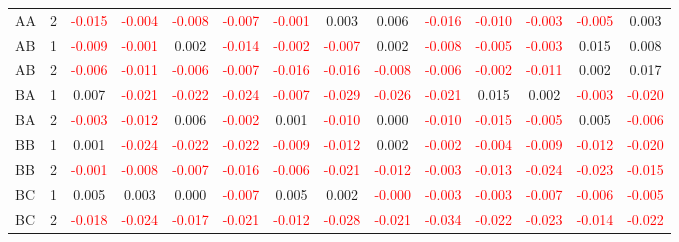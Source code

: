 \begin{table}[!htb]
{\begin{tabular}{llcccccccccccc}
AA & 2 & \textcolor{red}{-0.015} & \textcolor{red}{-0.004} & \textcolor{red}{-0.008} & \textcolor{red}{-0.007} & \textcolor{red}{-0.001} & 0.003 & 0.006 & \textcolor{red}{-0.016} & \textcolor{red}{-0.010} & \textcolor{red}{-0.003} & \textcolor{red}{-0.005} & 0.003\\
AB & 1 & \textcolor{red}{-0.009} & \textcolor{red}{-0.001} & 0.002 & \textcolor{red}{-0.014} & \textcolor{red}{-0.002} & \textcolor{red}{-0.007} & 0.002 & \textcolor{red}{-0.008} & \textcolor{red}{-0.005} & \textcolor{red}{-0.003} & 0.015 & 0.008\\
AB & 2 & \textcolor{red}{-0.006} & \textcolor{red}{-0.011} & \textcolor{red}{-0.006} & \textcolor{red}{-0.007} & \textcolor{red}{-0.016} & \textcolor{red}{-0.016} & \textcolor{red}{-0.008} & \textcolor{red}{-0.006} & \textcolor{red}{-0.002} & \textcolor{red}{-0.011} & 0.002 & 0.017\\
BA & 1 & 0.007 & \textcolor{red}{-0.021} & \textcolor{red}{-0.022} & \textcolor{red}{-0.024} & \textcolor{red}{-0.007} & \textcolor{red}{-0.029} & \textcolor{red}{-0.026} & \textcolor{red}{-0.021} & 0.015 & 0.002 & \textcolor{red}{-0.003} & \textcolor{red}{-0.020}\\
BA & 2 & \textcolor{red}{-0.003} & \textcolor{red}{-0.012} & 0.006 & \textcolor{red}{-0.002} & 0.001 & \textcolor{red}{-0.010} & 0.000 & \textcolor{red}{-0.010} & \textcolor{red}{-0.015} & \textcolor{red}{-0.005} & 0.005 & \textcolor{red}{-0.006}\\
BB & 1 & 0.001 & \textcolor{red}{-0.024} & \textcolor{red}{-0.022} & \textcolor{red}{-0.022} & \textcolor{red}{-0.009} & \textcolor{red}{-0.012} & 0.002 & \textcolor{red}{-0.002} & \textcolor{red}{-0.004} & \textcolor{red}{-0.009} & \textcolor{red}{-0.012} & \textcolor{red}{-0.020}\\
BB & 2 & \textcolor{red}{-0.001} & \textcolor{red}{-0.008} & \textcolor{red}{-0.007} & \textcolor{red}{-0.016} & \textcolor{red}{-0.006} & \textcolor{red}{-0.021} & \textcolor{red}{-0.012} & \textcolor{red}{-0.003} & \textcolor{red}{-0.013} & \textcolor{red}{-0.024} & \textcolor{red}{-0.023} & \textcolor{red}{-0.015}\\
BC & 1 & 0.005 & 0.003 & 0.000 & \textcolor{red}{-0.007} & 0.005 & 0.002 & \textcolor{red}{-0.000} & \textcolor{red}{-0.003} & \textcolor{red}{-0.003} & \textcolor{red}{-0.007} & \textcolor{red}{-0.006} & \textcolor{red}{-0.005}\\
BC & 2 & \textcolor{red}{-0.018} & \textcolor{red}{-0.024} & \textcolor{red}{-0.017} & \textcolor{red}{-0.021} & \textcolor{red}{-0.012} & \textcolor{red}{-0.028} & \textcolor{red}{-0.021} & \textcolor{red}{-0.034} & \textcolor{red}{-0.022} & \textcolor{red}{-0.023} & \textcolor{red}{-0.014} & \textcolor{red}{-0.022}\\

\end{tabular}}
\end{table}
